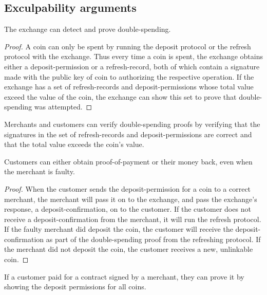 \documentclass[sigconf, authordraft]{acmart}
\begin{document}
\subsection{Exculpability arguments}

\begin{lemma}\label{lemma:double-spending}
The exchange can detect and prove double-spending.
\end{lemma}

\begin{proof}
A coin can only be spent by running the deposit protocol or the refresh
protocol with the exchange.  Thus every time a coin is spent, the exchange
obtains either a deposit-permission or a refresh-record, both of which
contain a signature made with the public key of coin to authorizing the
respective operation.  If the exchange has a set of refresh-records and
deposit-permissions whose total value exceed the value of the coin, the
exchange can show this set to prove that double-spending was attempted.
\end{proof}

\begin{corollary}
Merchants and customers can verify double-spending proofs by verifying that the
signatures in the set of refresh-records and deposit-permissions are correct and
that the total value exceeds the coin's value.
\end{corollary}

\begin{lemma}
Customers can either obtain proof-of-payment or their money back, even
when the merchant is faulty.
\end{lemma}

\begin{proof}
When the customer sends the deposit-permission for a coin to a correct
merchant, the merchant will pass it on to the exchange, and pass the
exchange's response, a deposit-confirmation, on to the customer.  If
the customer does not receive a deposit-confirmation from the
merchant, it will run the refresh protocol.  If the faulty merchant
did deposit the coin, the customer will receive the
deposit-confirmation as part of the double-spending proof from the
refreshing protocol.  If the merchant did not deposit the coin, the
customer receives a new, unlinkable coin.
\end{proof}

\begin{corollary}
If a customer paid for a contract signed by a merchant,
they can prove it by showing the deposit permissions for all coins.
\end{corollary}
\end{document}

